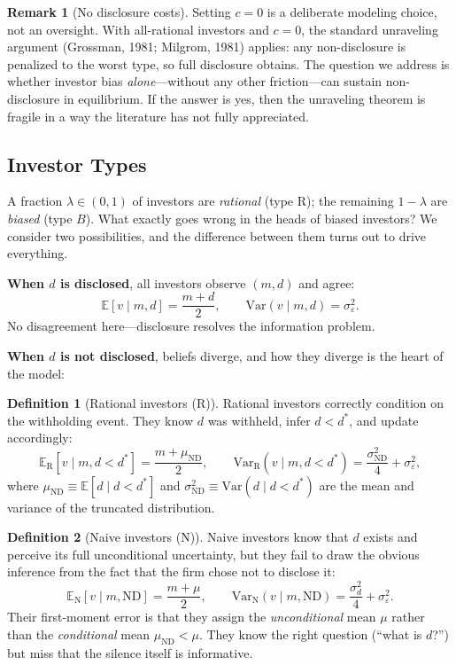 \documentclass[12pt]{article}
\theoremstyle{plain}
\theoremstyle{definition}
\newtheorem{definition}{Definition}
\newtheorem{remark}{Remark}
\newcommand{\E}{\mathbb{E}}
\newcommand{\Var}{\mathrm{Var}}
\newcommand{\ND}{\mathrm{ND}}
\newcommand{\R}{\mathrm{R}}
\newcommand{\N}{\mathrm{N}}
\begin{document}
\begin{remark}[No disclosure costs]
\label{rmk:no_cost}
Setting $c = 0$ is a deliberate modeling choice, not an oversight. With all-rational investors and $c = 0$, the standard unraveling argument (Grossman, 1981; Milgrom, 1981) applies: any non-disclosure is penalized to the worst type, so full disclosure obtains. The question we address is whether investor bias \emph{alone}---without any other friction---can sustain non-disclosure in equilibrium. If the answer is yes, then the unraveling theorem is fragile in a way the literature has not fully appreciated.
\end{remark}

\subsection{Investor Types}
\label{sec:types}

A fraction $\lambda \in (0,1)$ of investors are \emph{rational} (type $\R$); the remaining $1-\lambda$ are \emph{biased} (type $B$). What exactly goes wrong in the heads of biased investors? We consider two possibilities, and the difference between them turns out to drive everything.

\medskip
\noindent\textbf{When $d$ is disclosed}, all investors observe $(m, d)$ and agree:
\[
\E[v \mid m, d] = \frac{m + d}{2}, \qquad \Var(v \mid m, d) = \sigma_\varepsilon^2.
\]
No disagreement here---disclosure resolves the information problem.

\noindent\textbf{When $d$ is not disclosed}, beliefs diverge, and how they diverge is the heart of the model:

\begin{definition}[Rational investors ($\R$)]
\label{def:rational}
Rational investors correctly condition on the withholding event. They know $d$ was withheld, infer $d < d^*$, and update accordingly:
\[
\E_\R[v \mid m, d < d^*] = \frac{m + \mu_{\ND}}{2}, \qquad \Var_\R(v \mid m, d < d^*) = \frac{\sigma_{\ND}^2}{4} + \sigma_\varepsilon^2,
\]
where $\mu_{\ND} \equiv \E[d \mid d < d^*]$ and $\sigma_{\ND}^2 \equiv \Var(d \mid d < d^*)$ are the mean and variance of the truncated distribution.
\end{definition}

\begin{definition}[Naive investors ($\N$)]
\label{def:naive}
Naive investors know that $d$ exists and perceive its full unconditional uncertainty, but they fail to draw the obvious inference from the fact that the firm chose not to disclose it:
\[
\E_\N[v \mid m, \ND] = \frac{m + \mu}{2}, \qquad \Var_\N(v \mid m, \ND) = \frac{\sigma_d^2}{4} + \sigma_\varepsilon^2.
\]
Their first-moment error is that they assign the \emph{unconditional} mean $\mu$ rather than the \emph{conditional} mean $\mu_{\ND} < \mu$. They know the right question (``what is $d$?'') but miss that the silence itself is informative.
\end{definition}
\end{document}
